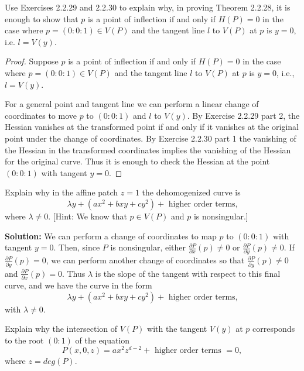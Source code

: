 \begin{tcolorbox}[title=Problem 31, breakable]
    Use Exercises 2.2.29 and 2.2.30 to explain why,
    in proving Theorem 2.2.28, it is enough to show that $p$ is a point 
    of inflection if and only if $H(P) = 0$ in the case where 
    $p = (0 : 0 : 1) \in V(P)$ and the tangent line $l$ 
    to $V(P)$ at $p$ is $y = 0$, i.e. $l = V(y)$.
\end{tcolorbox}

\begin{proof}
    Suppose $p$ is a point 
    of inflection if and only if $H(P) = 0$ in the case where 
    $p = (0 : 0 : 1) \in V(P)$ and the tangent line $l$ 
    to $V(P)$ at $p$ is $y = 0$, i.e., $l = V(y)$.  

    For a general point and tangent line we can perform a linear change of coordinates to move $p$ to $(0:0:1)$ and $l$ to $V(y)$.
    By Exercise 2.2.29 part 2, the Hessian vanishes at the transformed point if and only if it vanishes at the original point under the change of coordinates.  
    By Exercise 2.2.30 part 1 the vanishing of the Hessian in the transformed coordinates implies the vanishing of the Hessian for the original curve.  
    Thus it is enough to check the Hessian at the point $(0:0:1)$ with tangent $y = 0$.
\end{proof}

\begin{tcolorbox}[title=Problem 32, breakable]
    Explain why in the affine patch $z = 1$ the dehomogenized curve is 
    \[\lambda y + (a x^2 + bxy + c y^2) + \text{ higher order terms,}\]
    where $\lambda \ne 0$. [Hint: We know that $p \in V(P)$ and $p$ is nonsingular.]
\end{tcolorbox}

\textbf{Solution: } We can perform a change of coordinates to map $p$ to $(0 : 0 : 1)$
with tangent $y = 0$. Then, since $P$ is nonsingular, either $\frac{\partial P}{\partial x}(p) \ne 0$
or $\frac{\partial P}{\partial y}(p) \ne 0$. If $\frac{\partial P}{\partial y}(p) = 0$, we can perform
another change of coordinates so that $\frac{\partial P}{\partial y}(p) \ne 0$ and $\frac{\partial P}{\partial x}(p) = 0$.
Thus $\lambda$ is the slope of the tangent with respect to this final curve, and we have the curve in the form 
\[\lambda y + (a x^2 + bxy + c y^2) + \text{ higher order terms,}\]
with $\lambda \ne 0$.


\begin{tcolorbox}[title=Problem 33, breakable]
    Explain why the intersection of $V(P)$ with the tangent $V(y)$
        at $p$ corresponds to the root $(0 : 1)$ of the equation 
    \[P(x, 0, z) = a x^2 z^{d - 2} + \text{ higher order terms } = 0,\]
    where $z = deg(P)$.
\end{tcolorbox}

